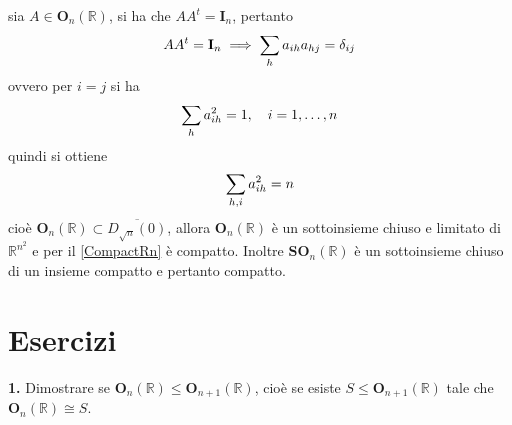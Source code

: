 \documentclass[oneside, 11pt]{amsbook}
\makeatletter
\newcommand{\0}{{(0)}}
\newcommand{\3}{{(3)}}
\theoremstyle{colonplain}
\theoremstyle{colondefinition}
\theoremstyle{colonremark}
\numberwithin{equation}{chapter}
\renewcommand{\proofname}{Dimostrazione}
\renewenvironment{proof}[1][\proofname]{\par
  \pushQED{\qed}%
  \normalfont \topsep6\p@\@plus6\p@\relax
  \trivlist
  \item[\hskip\labelsep\bfseries #1:]\ignorespaces
}{%
  \popQED\endtrivlist\@endpefalse
}
\makeatother
\begin{document}
\begin{proof} sia $A \in \mathbf{O}_n(\mathbb{R})$, si ha che $AA^t = \mathbf{I}_n$, pertanto
\begin{align}
    AA^t = \mathbf{I}_n \implies \sum_h a_{ih}a_{hj} = \delta_{ij} \notag
\end{align}
ovvero per $i = j$ si ha
\begin{align}
    \sum_h a^2_{ih} = 1, \quad i = 1, \dots, n \notag
\end{align}
quindi si ottiene
\begin{align}
    \sum_{h, i} a^2_{ih} = n \notag
\end{align}
cioè $\mathbf{O}_n(\mathbb{R}) \subset \overline{D_{\sqrt{n}}(0)}$, allora $\mathbf{O}_n(\mathbb{R})$ è un sottoinsieme chiuso e limitato di $\mathbb{R}^{n^2}$ e per il \cref{CompactRn} è compatto. Inoltre $\mathbf{SO}_n(\mathbb{R})$ è un sottoinsieme chiuso di un insieme compatto e pertanto compatto. \end{proof}

\section{Esercizi}
\textbf{1.} Dimostrare se $\mathbf{O}_n(\mathbb{R}) \leq \mathbf{O}_{n + 1}(\mathbb{R})$, cioè se esiste $S \leq \mathbf{O}_{n + 1}(\mathbb{R})$ tale che $\mathbf{O}_n(\mathbb{R}) \cong S$. \\
\end{document}
